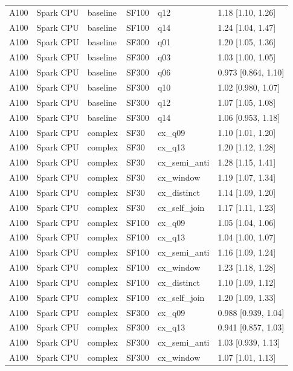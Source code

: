 \begin{longtable}{llllll}
A100 & Spark CPU & baseline & SF100 & q12 & 1.18 [1.10, 1.26] \\
A100 & Spark CPU & baseline & SF100 & q14 & 1.24 [1.04, 1.47] \\
A100 & Spark CPU & baseline & SF300 & q01 & 1.20 [1.05, 1.36] \\
A100 & Spark CPU & baseline & SF300 & q03 & 1.03 [1.00, 1.05] \\
A100 & Spark CPU & baseline & SF300 & q06 & 0.973 [0.864, 1.10] \\
A100 & Spark CPU & baseline & SF300 & q10 & 1.02 [0.980, 1.07] \\
A100 & Spark CPU & baseline & SF300 & q12 & 1.07 [1.05, 1.08] \\
A100 & Spark CPU & baseline & SF300 & q14 & 1.06 [0.953, 1.18] \\
A100 & Spark CPU & complex & SF30 & cx\_q09 & 1.10 [1.01, 1.20] \\
A100 & Spark CPU & complex & SF30 & cx\_q13 & 1.20 [1.12, 1.28] \\
A100 & Spark CPU & complex & SF30 & cx\_semi\_anti & 1.28 [1.15, 1.41] \\
A100 & Spark CPU & complex & SF30 & cx\_window & 1.19 [1.07, 1.34] \\
A100 & Spark CPU & complex & SF30 & cx\_distinct & 1.14 [1.09, 1.20] \\
A100 & Spark CPU & complex & SF30 & cx\_self\_join & 1.17 [1.11, 1.23] \\
A100 & Spark CPU & complex & SF100 & cx\_q09 & 1.05 [1.04, 1.06] \\
A100 & Spark CPU & complex & SF100 & cx\_q13 & 1.04 [1.00, 1.07] \\
A100 & Spark CPU & complex & SF100 & cx\_semi\_anti & 1.16 [1.09, 1.24] \\
A100 & Spark CPU & complex & SF100 & cx\_window & 1.23 [1.18, 1.28] \\
A100 & Spark CPU & complex & SF100 & cx\_distinct & 1.10 [1.09, 1.12] \\
A100 & Spark CPU & complex & SF100 & cx\_self\_join & 1.20 [1.09, 1.33] \\
A100 & Spark CPU & complex & SF300 & cx\_q09 & 0.988 [0.939, 1.04] \\
A100 & Spark CPU & complex & SF300 & cx\_q13 & 0.941 [0.857, 1.03] \\
A100 & Spark CPU & complex & SF300 & cx\_semi\_anti & 1.03 [0.939, 1.13] \\
A100 & Spark CPU & complex & SF300 & cx\_window & 1.07 [1.01, 1.13] \\

\end{longtable}
